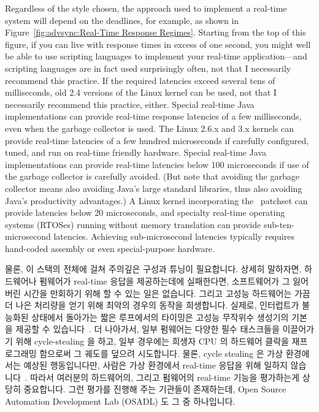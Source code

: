 Regardless of the style chosen, the approach used to implement a real-time
system will depend on the deadlines, for example, as shown in
Figure~\ref{fig:advsync:Real-Time Response Regimes}.
Starting from the top of this figure, if you can live with response times in
excess of one second, you might well be able to use scripting languages
to implement your real-time application---and scripting languages are
in fact used surprisingly often, not that I necessarily recommend this
practice.
If the required latencies exceed several tens of milliseconds,
old 2.4 versions of the Linux kernel can be used, not that I necessarily
recommend this practice, either.
Special real-time Java implementations can provide real-time response
latencies of a few milliseconds, even when the garbage collector is
used.
The Linux 2.6.x and 3.x kernels can provide real-time latencies of
a few hundred microseconds if carefully configured, tuned, and run
on real-time friendly hardware.
Special real-time Java implementations can provide real-time latencies
below 100 microseconds if use of the garbage collector is carefully avoided.
(But note that avoiding the garbage collector means also avoiding
Java's large standard libraries, thus also avoiding Java's productivity
advantages.)
A Linux kernel incorporating the \rt\ patchset can provide latencies
below 20 microseconds, and specialty real-time operating systems (RTOSes)
running without memory translation can provide sub-ten-microsecond
latencies.
Achieving sub-microsecond latencies typically requires hand-coded assembly
or even special-purpose hardware.
\fi

물론, 이 스택의 전체에 걸쳐 주의깊은 구성과 튜닝이 필요합니다.
상세히 말하자면, 하드웨어나 펌웨어가 real-time 응답을 제공하는데에 실패한다면,
소프트웨어가 그 잃어버린 시간을 만회하기 위해 할 수 있는 일은 없습니다.
그리고 고성능 하드웨어는 가끔 더 나은 처리량을 얻기 위해 최악의 경우의 동작을
희생합니다.
실제로, 인터럽트가 불능화된 상태에서 돌아가는 짧은 루프에서의 타이밍은 고성능
무작위수 생성기의 기본을 제공할 수
있습니다~\cite{PeterOkech2009InherentRandomness}.
더 나아가서, 일부 펌웨어는 다양한 필수 태스크들을 이끌어가기 위해
cycle-stealing 을 하고, 일부 경우에는 희생자 CPU 의 하드웨어 클락을
재프로그래밍 함으로써 그 궤도를 덮으려 시도합니다.
물론, cycle stealing 은 가상 환경에서는 예상된 행동입니다만, 사람은 가상
환경에서 real-time 응답을 위해 일하지
않습니다~\cite{ThomasGleixner2012KVMrealtime,JanKiszka2014virtRT}.
따라서 여러분의 하드웨어의, 그리고 펌웨어의 real-time 기능을 평가하는게 상당히
중요합니다.
그런 평가를 진행해 주는 기관들이 존재하는데, Open Source Automation Development
Lab (OSADL) 도 그 중 하나입니다.
\iffalse

